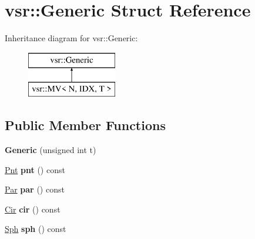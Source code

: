 \hypertarget{structvsr_1_1_generic}{\section{vsr\-:\-:Generic Struct Reference}
\label{structvsr_1_1_generic}
}
Inheritance diagram for vsr\-:\-:Generic\-:\begin{figure}[H]
\begin{center}
\leavevmode
\includegraphics[height=2.000000cm]{structvsr_1_1_generic}
\end{center}
\end{figure}
\subsection*{Public Member Functions}
\begin{DoxyCompactItemize}
\item 
\hypertarget{structvsr_1_1_generic_a08efd30d0bc9f99eb7c257ee3494d76b}{{\bfseries Generic} (unsigned int t)}\label{structvsr_1_1_generic_a08efd30d0bc9f99eb7c257ee3494d76b}

\item 
\hypertarget{structvsr_1_1_generic_af0854475433badfcbcee56ca80924ce9}{\hyperlink{namespacevsr_a2d05beb9721c5d9211b479af6d47222d}{Pnt} {\bfseries pnt} () const }\label{structvsr_1_1_generic_af0854475433badfcbcee56ca80924ce9}

\item 
\hypertarget{structvsr_1_1_generic_a0e14c904184709dec772e43524e98f08}{\hyperlink{namespacevsr_ae046793ece205351429a6346a66fd6eb}{Par} {\bfseries par} () const }\label{structvsr_1_1_generic_a0e14c904184709dec772e43524e98f08}

\item 
\hypertarget{structvsr_1_1_generic_a35971ece26bdb574f924487abc003f5a}{\hyperlink{namespacevsr_a2744605aa828e495fc85463b7ae0d045}{Cir} {\bfseries cir} () const }\label{structvsr_1_1_generic_a35971ece26bdb574f924487abc003f5a}

\item 
\hypertarget{structvsr_1_1_generic_aa2b071688d4b7583b8ddf7b0aabfc438}{\hyperlink{namespacevsr_a3cf58c26bcb862198f1a2ee838c5f337}{Sph} {\bfseries sph} () const }\label{structvsr_1_1_generic_aa2b071688d4b7583b8ddf7b0aabfc438}

\end{DoxyCompactItemize}
